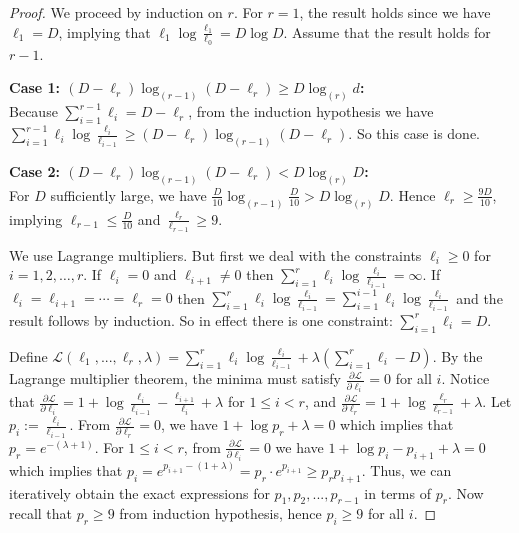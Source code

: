 \documentclass[10pt,a4paper]{amsart}
\def\cL{{\mathcal L}}
\begin{document}
\begin{proof}
	We proceed by induction on $r$. For $r=1$, the result holds since we have $\ell_1=D$, implying that $\ell_1\log\frac{\ell_1}{\ell_0} = D\log D$. Assume that the result holds for $r-1$.  

{\bf Case 1: $(D-\ell_r)\log_{(r-1)}(D-\ell_r) \geq D\log_{(r)} d$:}\\
Because $\sum\limits_{i=1}^{r-1} \ell_i = D-\ell_r$, from the induction hypothesis we have $\sum\limits_{i=1}^{r-1} \ell_i\log\frac{\ell_i}{\ell_{i-1}} \geq (D-\ell_r)\log_{(r-1)}(D-\ell_r)$. So this case is done.

{\bf Case 2: $(D-\ell_r)\log_{(r-1)}(D-\ell_r)< D\log_{(r)} D$:}\\
For $D$ sufficiently large, we have $\frac{D}{10}\log_{(r-1)} \frac{D}{10} > D\log_{(r)} D$. Hence $\ell_r \geq \frac{9D}{10}$, implying $\ell_{r-1} \leq \frac{D}{10}$ and $\frac{\ell_r}{\ell_{r-1}} \geq 9$.

We use Lagrange multipliers. But first we deal with the constraints $\ell_i\geq 0$ for $i=1,2,\ldots,r$. If $\ell_i=0$ and $\ell_{i+1}\neq 0$ then $\sum\limits_{i=1}^r \ell_i \log \frac{\ell_i}{\ell_{i-1}}=\infty$. If $\ell_i=\ell_{i+1}=\cdots=\ell_r=0$ then $\sum\limits_{i=1}^r \ell_i \log \frac{\ell_i}{\ell_{i-1}}=\sum\limits_{i=1}^{i-1} \ell_i \log \frac{\ell_i}{\ell_{i-1}}$ and the result follows by induction.  So in effect there is one constraint: $\sum\limits_{i=1}^r \ell_i = D$.

Define $\cL(\ell_1,...,\ell_r,\lambda) = \sum\limits_{i=1}^r \ell_i \log \frac{\ell_i}{\ell_{i-1}} + \lambda \left(\sum\limits_{i=1}^r \ell_i - D\right)$. By the Lagrange multiplier theorem, the minima must satisfy $\frac{\partial\cL}{\partial \ell_i} = 0$ for all $i$. Notice that $\frac{\partial \cL}{\partial \ell_i} = 1 + \log\frac{\ell_{i}}{\ell_{i-1}} - \frac{\ell_{i+1}}{\ell_i} + \lambda$ for $1 \leq i < r$, and $\frac{\partial\cL}{\partial\ell_r} = 1+\log \frac{\ell_r}{\ell_{r-1}} +\lambda$. Let $p_i := \frac{\ell_i}{\ell_{i-1}}$. From $\frac{\partial\cL}{\partial \ell_r}=0$, we have $1+\log p_r + \lambda = 0$ which implies that $p_r = e^{-(\lambda+1)}$. For $1\leq i<r$, from $\frac{\partial\cL}{\partial\ell_i}=0$ we have $1+\log p_i -p_{i+1}+\lambda = 0$ which  implies that $p_i = e^{p_{i+1}-(1+\lambda)} = p_r\cdot e^{p_{i+1}}\geq p_rp_{i+1}$. Thus, we can iteratively obtain the exact expressions for $p_1,p_2,...,p_{r-1}$ in terms of $p_r$. Now recall that $p_r\geq 9$ from induction hypothesis, hence $p_i \geq 9$ for all $i$. 
	

\end{proof}
\end{document}
